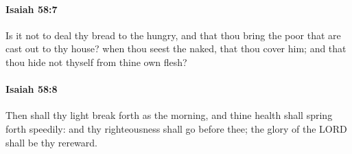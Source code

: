 		\paragraph{Isaiah 58:7} %
			\label{ISAIAH-58-7}

			Is it not to deal thy bread to the hungry, and that thou bring the poor that are cast out to thy house? when thou seest the naked, that thou cover him; and that thou hide not thyself from thine own flesh?


		\paragraph{Isaiah 58:8} %
			\label{ISAIAH-58-8}

			Then shall thy light break forth as the morning, and thine health shall spring forth speedily: and thy righteousness shall go before thee; the glory of the LORD shall be thy rereward.

